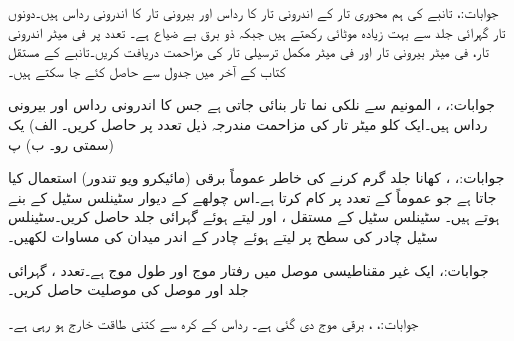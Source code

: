 جوابات:، 
تانبے کی ہم محوری تار کے اندرونی تار کا رداس  اور  بیرونی تار کا اندرونی رداس  ہیں۔دونوں تار گہرائی جلد  سے بہت زیادہ موٹائی رکھتے ہیں جبکہ ذو برق بے ضیاع ہے۔ تعدد پر فی میٹر اندرونی تار، فی میٹر بیرونی تار اور فی میٹر مکمل ترسیلی تار کی مزاحمت دریافت کریں۔تانبے کے مستقل کتاب کے آخر میں جدول  سے حاصل کئے جا سکتے ہیں۔

جوابات:، ، 
المونیم  سے نلکی نما تار بنائی جاتی ہے جس کا اندرونی رداس  اور بیرونی رداس  ہیں۔ایک کلو میٹر تار کی مزاحمت مندرجہ ذیل تعدد پر حاصل کریں۔ الف) یک سمتی رو۔ ب) پ) 

جوابات:، ، 
کھانا جلد گرم کرنے کی خاطر عموماً برقی  (مائیکرو ویو تندور)  استعمال کیا جاتا ہے جو عموماً  کے تعدد پر کام کرتا ہے۔اس چولھے کے دیوار سٹینلس سٹیل کے بنے ہوتے ہیں۔ سٹینلس سٹیل کے مستقل ،  اور  لیتے ہوئے گہرائی جلد  حاصل کریں۔سٹینلس سٹیل چادر کی سطح پر
  لیتے ہوئے چادر کے اندر میدان کی مساوات لکھیں۔

جوابات:،    
ایک غیر مقناطیسی موصل میں رفتار موج  اور طول موج  ہے۔تعدد ، گہرائی جلد   اور موصل کی موصلیت  حاصل کریں۔

جوابات:، ،   
برقی موج  دی گئی ہے۔ رداس  کے کرہ سے کتنی طاقت خارج ہو رہی ہے۔


